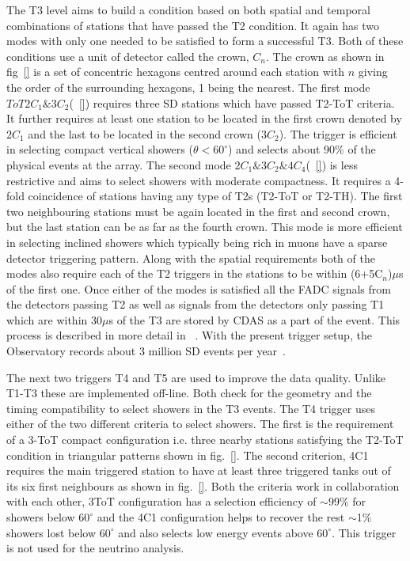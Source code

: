 The T3 level aims to build a condition based on both spatial and temporal combinations of stations that have passed the T2 condition. It again has two modes with only one needed to be satisfied to form a successful T3. Both of these conditions use a unit of detector called the crown, $C_n$. The crown as shown in fig~\ref{} is a set of concentric hexagons centred around each station with $n$ giving the order of the surrounding hexagons, 1 being the nearest. The first mode $ToT2C_1\&3C_2$(~\ref{}) requires three SD stations which have passed T2-ToT criteria. It further requires at least one station to be located in the first crown denoted by $2C_1$ and the last to be located in the second crown ($3C_2$). The trigger is efficient in selecting compact vertical showers ($\theta < 60^{\circ}$) and selects about 90\% of the physical events at the array. The second mode $2C_1\&3C_2\&4C_4$(~\ref{}) is less restrictive and aims to select showers with moderate compactness. It requires a 4-fold coincidence of stations having any type of T2s (T2-ToT or T2-TH). The first two neighbouring stations must be again located in the first and second crown, but the last station can be as far as the fourth crown. This mode is more efficient in selecting inclined showers which typically being rich in muons have a sparse detector triggering pattern. Along with the spatial requirements both of the modes also require each of the T2 triggers in the stations to be within (6+5C$_n$)$\mu$s of the first one. Once either of the modes is satisfied all the FADC signals from the detectors passing T2 as well as signals from the detectors only passing T1 which are within 30$\mu$s of the T3 are stored by CDAS as a part of the event. This process is described in more detail in ~\cite{Auger:2015}. With the present trigger setup, the Observatory records about 3 million SD events per year~\cite{Auger:2015}. 

The next two triggers T4 and T5 are used to improve the data quality. Unlike T1-T3 these are implemented off-line. Both check for the geometry and the timing compatibility to select showers in the T3 events. The T4 trigger uses either of the two different criteria to select showers. The first is the requirement of a 3-ToT compact configuration i.e. three nearby stations satisfying the T2-ToT condition in triangular patterns shown in fig.~\ref{}. The second criterion, 4C1 requires the main triggered station to have at least three triggered tanks out of its six first neighbours as shown in fig.~\ref{}. Both the criteria work in collaboration with each other, 3ToT configuration has a selection efficiency of $\sim$99\% for showers below $60^{\circ}$ and the 4C1 configuration helps to recover the rest $\sim$1\% showers lost below $60^{\circ}$ and also selects low energy events above $60^{\circ}$. This trigger is not used for the neutrino analysis.

